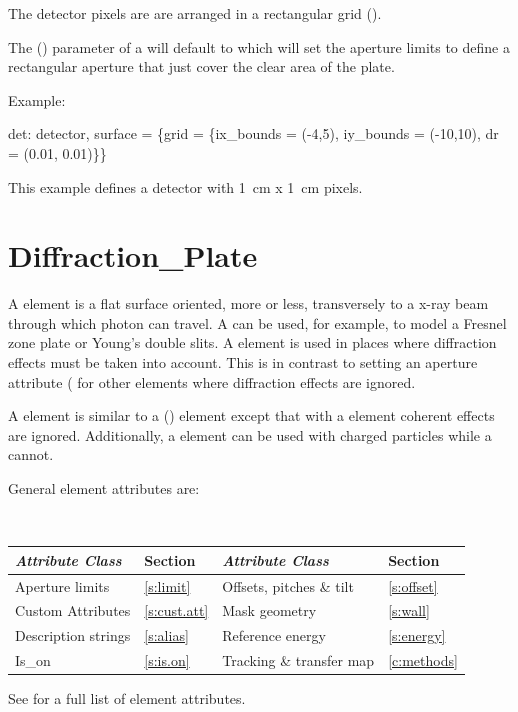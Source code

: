 The detector pixels are are arranged in a rectangular grid (). 

The  () parameter of a
 will default to  which will set the
aperture limits to define a rectangular aperture that just cover the
clear area of the plate.

Example:
\begin{example}
  det: detector, surface = \{grid = 
          \{ix_bounds = (-4,5), iy_bounds = (-10,10), dr = (0.01, 0.01)\}\}
\end{example}
This example defines a detector with 1~cm x 1~cm pixels.

\section{Diffraction_Plate}
\label{s:diff.plate}

A  element is a flat surface oriented, more or
less, transversely to a x-ray beam through which photon can travel. A
 can be used, for example, to model a Fresnel
zone plate or Young's double slits. A  element
is used in places where diffraction effects must be taken into
account. This is in contrast to setting an aperture attribute
( for other elements where diffraction effects are
ignored.

A  element is similar to a 
() element except that with a  element coherent
effects are ignored. Additionally, a  element can be used
with charged particles while a  cannot.

General  element attributes are:
\begin{center}
\tt 
\begin{tabular}{llll} \toprule
  {\sl Attribute Class}      & Section          & {\sl Attribute Class}      & Section         \\ \midrule
  Aperture limits            & \ref{s:limit}    & Offsets, pitches \& tilt   & \ref{s:offset}   \\ 
  Custom Attributes          & \ref{s:cust.att} & Mask geometry              & \ref{s:wall}    \\
  Description strings        & \ref{s:alias}    & Reference energy           & \ref{s:energy}  \\
  Is_on                      & \ref{s:is.on}    & Tracking \& transfer map   & \ref{c:methods} \\
  \bottomrule
\end{tabular}
\end{center}
\toffset
See  for a full list of element attributes.

